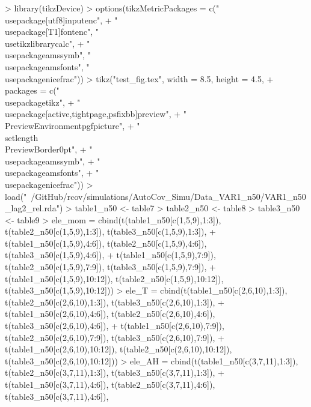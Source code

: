 \documentclass{article}
\begin{document}


\begin{Schunk}
\begin{Sinput}
> library(tikzDevice)
> options(tikzMetricPackages = c("\\usepackage[utf8]{inputenc}",
+     "\\usepackage[T1]{fontenc}", "\\usetikzlibrary{calc}",
+     "\\usepackage{amssymb}", "\\usepackage{amsfonts}", "\\usepackage{nicefrac}"))
> tikz("test_fig.tex", width = 8.5, height = 4.5,
+      packages = c("\\usepackage{tikz}",
+                  "\\usepackage[active,tightpage,psfixbb]{preview}",
+                  "\\PreviewEnvironment{pgfpicture}",
+                  "\\setlength\\PreviewBorder{0pt}",
+                  "\\usepackage{amssymb}",
+                  "\\usepackage{amsfonts}",
+                  "\\usepackage{nicefrac}"))
> load("~/GitHub/rcov/simulations/AutoCov_Simu/Data_VAR1_n50/VAR1_n50_lag2_rel.rda")
> table1_n50 <- table7
> table2_n50 <- table8
> table3_n50 <- table9
> ele_mom = cbind(t(table1_n50[c(1,5,9),1:3]), t(table2_n50[c(1,5,9),1:3]), t(table3_n50[c(1,5,9),1:3]),
+                 t(table1_n50[c(1,5,9),4:6]), t(table2_n50[c(1,5,9),4:6]), t(table3_n50[c(1,5,9),4:6]),
+                 t(table1_n50[c(1,5,9),7:9]), t(table2_n50[c(1,5,9),7:9]), t(table3_n50[c(1,5,9),7:9]),
+                 t(table1_n50[c(1,5,9),10:12]), t(table2_n50[c(1,5,9),10:12]), t(table3_n50[c(1,5,9),10:12]))
> ele_T = cbind(t(table1_n50[c(2,6,10),1:3]), t(table2_n50[c(2,6,10),1:3]), t(table3_n50[c(2,6,10),1:3]),
+               t(table1_n50[c(2,6,10),4:6]), t(table2_n50[c(2,6,10),4:6]), t(table3_n50[c(2,6,10),4:6]),
+               t(table1_n50[c(2,6,10),7:9]), t(table2_n50[c(2,6,10),7:9]), t(table3_n50[c(2,6,10),7:9]),
+               t(table1_n50[c(2,6,10),10:12]), t(table2_n50[c(2,6,10),10:12]), t(table3_n50[c(2,6,10),10:12]))
> ele_AH = cbind(t(table1_n50[c(3,7,11),1:3]), t(table2_n50[c(3,7,11),1:3]), t(table3_n50[c(3,7,11),1:3]),
+                t(table1_n50[c(3,7,11),4:6]), t(table2_n50[c(3,7,11),4:6]), t(table3_n50[c(3,7,11),4:6]),

\end{Sinput}
\end{Schunk}
\end{document}
